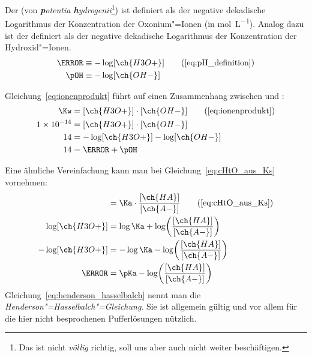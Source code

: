 \documentclass{scrartcl}
\begin{document}
\begin{definition}
  Der \pH{} (von \textit{\textbf{p}otentia \textbf{h}ydrogenii}\footnote{Das ist
    nicht \emph{völlig} richtig, soll uns aber auch nicht weiter
    beschäftigen.}) ist definiert als der negative dekadische Logarithmus der
  Konzentration der Oxonium"=Ionen (in \si{\mole\per\liter}).  Analog dazu ist
  der \pOH{} definiert als der negative dekadische Logarithmus der
  Konzentration der Hydroxid"=Ionen.
  \begin{align}
    \pH  &\equiv -\log[\ch{H3O+}] \tag{\ref{eq:pH_definition}} \\
    \pOH &\equiv -\log[\ch{OH-}]
  \end{align}
\end{definition}

Gleichung~\eqref{eq:ionenprodukt} führt auf einen Zusammenhang zwischen \pH
und \pOH:
\begin{align}
  \Kw         &= [\ch{H3O+}] \cdot [\ch{OH-}] \tag{\ref{eq:ionenprodukt}} \\
  \num{1e-14} &= [\ch{H3O+}] \cdot [\ch{OH-}] \\
  14          &= -\log[\ch{H3O+}] -\log[\ch{OH-}] \\
  14          &= \pH + \pOH \label{eq:ionensumme}
\end{align}

Eine ähnliche Vereinfachung kann man bei Gleichung~\eqref{eq:cHtO_aus_Ks}
vornehmen:
\begin{align}
  [\ch{H3O+}]      &=
    \Ka \cdot \frac{ [\ch{HA}] }{ [\ch{A-}] } \tag{\ref{eq:cHtO_aus_Ks}} \\
  \log[\ch{H3O+}]  &=
    \log\Ka + \log\biggl(\frac{ [\ch{HA}] }{ [\ch{A-}] }\biggr) \\
  -\log[\ch{H3O+}] &=
    -\log\Ka - \log\biggl(\frac{ [\ch{HA}] }{ [\ch{A-}] }\biggr) \\
  \pH             &=
    \pKa - \log\biggl(\frac{ [\ch{HA}] }{ [\ch{A-}] }\biggr)
    \label{eq:henderson_hasselbalch}
\end{align}
Gleichung~\eqref{eq:henderson_hasselbalch} nennt man die
\emph{Henderson"=Hasselbalch"=Gleichung}.  Sie ist allgemein gültig und vor
allem für die hier nicht besprochenen Pufferlösungen nützlich.
\end{document}
